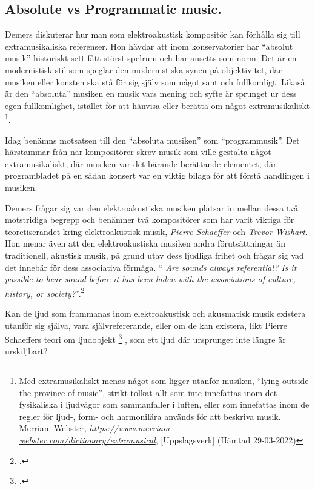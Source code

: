 \documentclass{article}
\begin{document}


\subsection{Absolute vs Programmatic music.}
Demers diskuterar hur man som elektroakustisk kompositör kan förhålla sig till extramusikaliska referenser.
Hon hävdar att inom konservatorier har ``absolut musik'' historiskt sett fått störst spelrum och har ansetts
som norm. Det är en modernistisk stil som speglar den modernistiska synen på objektivitet, där musiken eller
konsten ska stå för sig själv som något sant och fullkomligt. Likaså är den ``absoluta'' musiken en musik vars
mening och syfte är sprunget ur dess egen fullkomlighet, istället för att hänvisa eller berätta om något
extramusikaliskt \footnote{Med extramusikaliskt menas något som ligger utanför musiken, ``lying outside the
province of music'', strikt tolkat allt som inte innefattas inom det fysikaliska i ljudvågor som sammanfaller
i luften, eller som innefattas inom de regler för ljud-, form- och harmonilära används för att beskriva musik.
\\ Merriam-Webster, \emph{\url{https://www.merriam-webster.com/dictionary/extramusical}}, [Uppslagsverk]
(Hämtad 29-03-2022)}.

Idag benämns motsatsen till den ``absoluta musiken'' som ``programmusik''. Det härstammar från när
kompositörer skrev musik som ville gestalta något extramusikaliskt, där musiken var det bärande berättande
elementet, där programbladet på en sådan konsert var en viktig bilaga för att förstå handlingen i musiken. 

Demers frågar sig var den elektroakustiska musiken platsar in mellan dessa två motstridiga begrepp och
benämner två kompositörer som har varit viktiga för teoretiserandet kring elektroakustisk musik, \emph{Pierre
Schaeffer} och \emph{Trevor Wishart}. Hon menar även att den elektroakustiska musiken andra förutsättningar än
traditionell, akustisk musik, på grund utav dess ljudliga frihet och frågar sig vad det innebär för dess
associativa förmåga. `` \emph{Are sounds always referential? Is it possible to hear sound before it has been
laden with the associations of culture, history, or society?}''.\footcite[23]{JoannaDemers}

Kan de ljud som frammanas inom elektroakustisk och akusmatisk musik existera utanför sig själva, vara
självrefererande, eller om de kan existera, likt Pierre Schaeffers teori om ljudobjekt
\footcite{PierreSchaeffer} , som ett ljud där ursprunget inte längre är urskiljbart?
\end{document}
